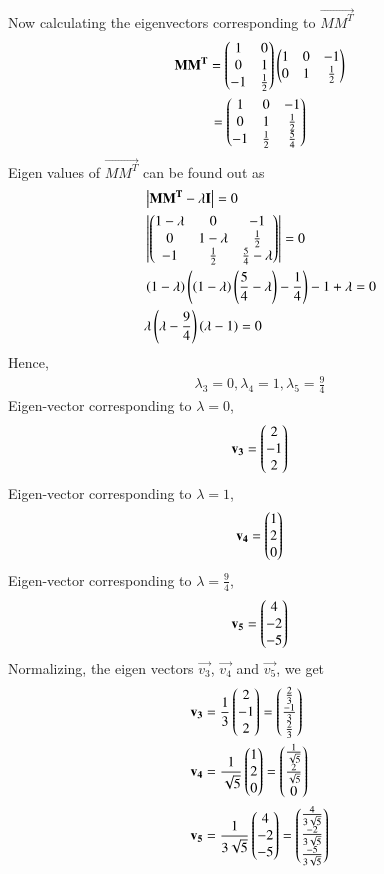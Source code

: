 Now calculating the eigenvectors corresponding to $\vec{MM^T}$
\begin{multline}
\mathbf{MM^T} = \begin{pmatrix}1 & 0 \\ 0 & 1 \\ -1 & \frac{1}{2}\end{pmatrix}\begin{pmatrix}1 & 0 & -1 \\ 0 & 1 & \frac{1}{2} \end{pmatrix} \\ =
\begin{pmatrix}1 & 0 &-1 \\ 0 & 1 & \frac{1}{2} \\ -1 & \frac{1}{2} & \frac{5}{4}\end{pmatrix}
\end{multline}
Eigen values of $\vec{MM^T}$ can be found out as
\begin{align}
	& \left\vert\mathbf{MM^T-\lambda I}\right\vert = 0 \\
	& \left\vert\begin{pmatrix}1-\lambda & 0 & -1 \\ 0 & 1-\lambda & \frac{1}{2} \\ -1 & \frac{1}{2} & \frac{5}{4}-\lambda\end{pmatrix}\right\vert = 0 \\
	& \left(1-\lambda\right)\left(\left(1-\lambda\right)\left(\frac{5}{4}-\lambda\right)-\frac{1}{4}\right)
	-1+\lambda = 0 \\
	& \lambda\left(\lambda-\frac{9}{4}\right)\left(\lambda-1\right) = 0  
\end{align}
Hence,
\begin{align}
\lambda_3 = 0, \lambda_4 = 1, \lambda_5=\frac{9}{4}
\end{align}
Eigen-vector corresponding to $\lambda=0$,
\begin{align}
	\mathbf{v_3} = \begin{pmatrix}2 \\ -1 \\ 2\end{pmatrix}
\end{align}
Eigen-vector corresponding to $\lambda=1$,
\begin{align}
	\mathbf{v_4} = \begin{pmatrix}1 \\ 2 \\ 0\end{pmatrix}
\end{align}
Eigen-vector corresponding to $\lambda=\frac{9}{4}$,
\begin{align}
	\mathbf{v_5} = \begin{pmatrix}4 \\ -2 \\ -5\end{pmatrix}
\end{align}
Normalizing, the eigen vectors $\vec{v_3}$, $\vec{v_4}$ and $\vec{v_5}$, we get
\begin{align}
	& \mathbf{v_3} = \frac{1}{3}\begin{pmatrix}2 \\ -1 \\ 2\end{pmatrix} = \begin{pmatrix}\frac{2}{3} \\ \frac{-1}{3} \\ \frac{2}{3}\end{pmatrix} \\
	& \mathbf{v_4} = \frac{1}{\sqrt{5}}\begin{pmatrix}1 \\ 2 \\ 0\end{pmatrix} = \begin{pmatrix}\frac{1}{\sqrt{5}} \\ \frac{2}{\sqrt{5}} \\ 0\end{pmatrix} \\ 
	& \mathbf{v_5} = \frac{1}{3\sqrt{5}}\begin{pmatrix}4 \\ -2 \\ -5\end{pmatrix} =  \begin{pmatrix}\frac{4}{3\sqrt{5}} \\ \frac{-2}{3\sqrt{5}} \\ \frac{-5}{3\sqrt{5}}\end{pmatrix}
\end{align}

